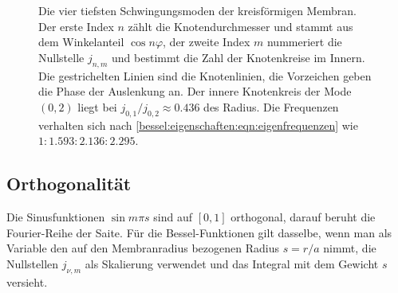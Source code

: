 \begin{figure}
\centering
{}
\caption{Die vier tiefsten Schwingungsmoden der kreisförmigen Membran.
Der erste Index $n$ zählt die Knotendurchmesser und stammt aus dem Winkelanteil $\cos n\varphi$, der zweite Index $m$ nummeriert die Nullstelle $j_{n,m}$ und bestimmt die Zahl der Knotenkreise im Innern.
Die gestrichelten Linien sind die Knotenlinien, die Vorzeichen geben die Phase der Auslenkung an.
Der innere Knotenkreis der Mode $(0,2)$ liegt bei $j_{0,1}/j_{0,2}\approx 0.436$ des Radius.
Die Frequenzen verhalten sich nach \eqref{bessel:eigenschaften:eqn:eigenfrequenzen} wie $1 : 1.593 : 2.136 : 2.295$.
\label{bessel:eigenschaften:fig:moden}}
\end{figure}

%
%
\subsection{Orthogonalität
\label{bessel:eigenschaften:subsection:orthogonalitaet}}
Die Sinusfunktionen $\sin m\pi s$ sind auf $[0,1]$ orthogonal, darauf beruht die Fourier-Reihe der Saite.
%
%
%
Für die Bessel-Funktionen gilt dasselbe, wenn man als Variable den auf den Membranradius bezogenen Radius $s=r/a$ nimmt, die Nullstellen $j_{\nu,m}$ als Skalierung verwendet und das Integral mit dem Gewicht $s$ versieht.
%

